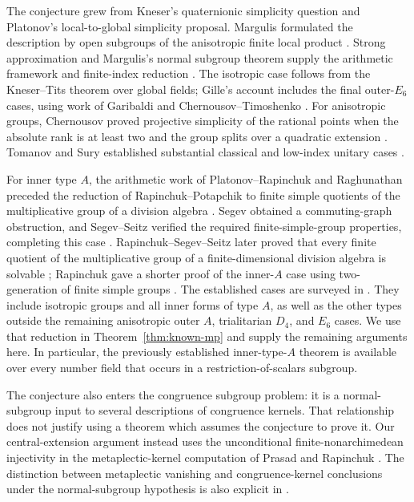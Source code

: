 The conjecture grew from Kneser's quaternionic simplicity question and
Platonov's local-to-global simplicity proposal. Margulis formulated the
description by open subgroups of the anisotropic finite local product
\cite[Russian original, Section~2.4.8]{Margulis1979}.
Strong approximation and Margulis's normal subgroup theorem supply the
arithmetic framework and finite-index reduction \cite{PRbook,Margulis}.
The isotropic case follows from the Kneser--Tits theorem over global
fields; Gille's account includes the final outer-$E_6$ cases, using work
of Garibaldi and Chernousov--Timoshenko
\cite[Theorem~8.1]{Gille2009}. For anisotropic groups, Chernousov proved
projective simplicity of the rational points when the absolute rank is
at least two and the group splits over a quadratic extension
\cite[Theorem~1]{Chernousov1990}. Tomanov and Sury established substantial
classical and low-index unitary cases \cite{Tomanov1990,Sury1991}.

For inner type $A$, the arithmetic work of Platonov--Rapinchuk and
Raghunathan \cite{PR1984,Raghunathan1988} preceded the reduction of
Rapinchuk--Potapchik to finite simple quotients of the multiplicative
group of a division algebra \cite{RapinchukPotapchik1996}.
Segev obtained a commuting-graph obstruction, and Segev--Seitz verified
the required finite-simple-group properties, completing this case
\cite{Segev1999,SegevSeitz2002}. Rapinchuk--Segev--Seitz later proved
that every finite quotient of the multiplicative group of a
finite-dimensional division algebra is solvable
\cite{RapinchukSegevSeitz2002}; Rapinchuk gave a shorter proof of the
inner-$A$ case using two-generation of finite simple groups
\cite{Rapinchuk2006}. The established cases are surveyed in
\cite[Sections~3.4--3.5]{PRsurvey}. They include isotropic groups and
all inner forms of type $A$, as well as the other types outside the
remaining anisotropic outer $A$, trialitarian $D_4$, and $E_6$ cases.
We use that reduction in Theorem~\ref{thm:known-mp} and supply the
remaining arguments here. In particular, the previously established
inner-type-$A$ theorem is available over every number field that occurs
in a restriction-of-scalars subgroup.

The conjecture also enters the congruence subgroup problem: it is a
normal-subgroup input to several descriptions of congruence kernels.
That relationship does not justify using a theorem which assumes the
conjecture to prove it. Our central-extension argument instead uses the
unconditional finite-nonarchimedean injectivity in the metaplectic-kernel
computation of Prasad and Rapinchuk \cite[Proposition~2.6]{PRmetaplectic}.
The distinction between metaplectic vanishing and congruence-kernel
conclusions under the normal-subgroup hypothesis is also explicit in
\cite[Section~2]{Rapinchuk2026}.


